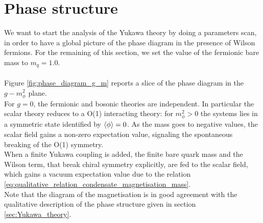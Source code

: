 \section{Phase structure}
We want to start the analysis of the Yukawa theory by doing a parameters scan, in order to have a global picture of the phase diagram in the presence of Wilson fermions. For the remaining of this section, we set the value of the fermionic bare mass to $m_q = 1.0$.\\~\\
Figure \ref{fig:phase_diagram_g_m} reports a slice of the phase diagram in the $g-m_\phi^2$ plane. \\
For $g=0$, the fermionic and bosonic theories are independent. In particular the scalar theory reduces to a O(1) interacting theory: for $m_\phi^2>0$ the systems lies in a symmetric state identified by $\left\langle \phi \right\rangle = 0$. 
As the mass goes to negative values, the scalar field gains a non-zero expectation value, signaling the spontaneous breaking of the O(1) symmetry. \\
When a finite Yukawa coupling is added, the finite bare quark mass and the Wilson term, that break chiral symmetry explicitly, are fed to the scalar field, which gains a vacuum expectation value due to the relation \eqref{eq:qualitative_relation_condensate_magnetisation_mass}. \\
Note that the diagram of the magnetisation is in good agreement with the qualitative description of the phase structure given in section \ref{sec:Yukawa_theory}.

